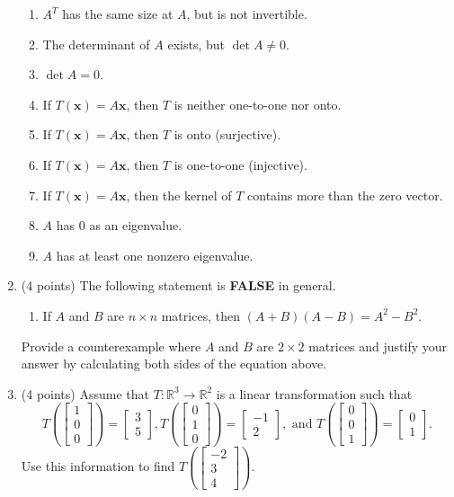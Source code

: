\documentclass[11pt]{article}
\theoremstyle{definition}
\begin{document}
\begin{enumerate}
\begin{enumerate}
\item $A^T$ has the same size at $A$, but is not invertible.
\item The determinant of $A$ exists, but $\det A \neq 0$.
\item $\det A = 0$.
\item If $T(\mathbf{x})=A\mathbf{x}$, then $T$ is neither one-to-one nor onto.
\item If $T(\mathbf{x})=A\mathbf{x}$, then $T$ is onto (surjective).
\item If $T(\mathbf{x})=A\mathbf{x}$, then $T$ is one-to-one (injective).
\item If $T(\mathbf{x})=A\mathbf{x}$, then the kernel of $T$ contains more than the zero vector.
\item $A$ has 0 as an eigenvalue.
\item $A$ has at least one nonzero eigenvalue.
\end{enumerate}

\item (4 points) The following statement is \textbf{FALSE} in general.

\begin{enumerate}
  \item[] If $A$ and $B$ are $n \times n$ matrices, then $(A+B)(A-B)=A^2-B^2$.
\end{enumerate}

Provide a counterexample where $A$ and $B$ are $2 \times 2$ matrices and justify your answer by calculating both sides of the equation above. 

\newpage

\item (4 points) Assume that $T:\mathbb{R}^3\to \mathbb{R}^2$ is a linear transformation such that
  	$$T\left(\left[\begin{array}{r}1 \\0 \\0\end{array}\right]\right)=\left[\begin{array}{r}3 \\5\end{array}\right], T\left(\left[\begin{array}{r}0 \\1 \\0\end{array}\right]\right)=\left[\begin{array}{r}-1 \\2\end{array}\right], \textrm{\ and\ } T\left(\left[\begin{array}{c}0 \\0 \\1\end{array}\right]\right)=\left[\begin{array}{c}0 \\1\end{array}\right].$$
Use this information to find $T\left(\left[\begin{array}{r}-2 \\3 \\4\end{array}\right]\right).$


\end{enumerate}
\end{document}
